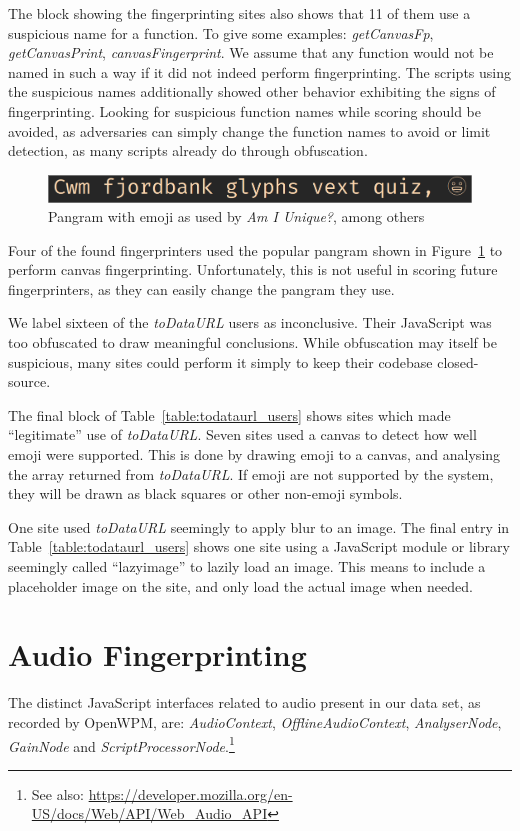 \documentclass[
    fontsize=12pt,
    headings=small,
    parskip=half,
    bibliography=totoc,
    numbers=noenddot,
    open=any
    ]{scrreprt}
\begin{document}
The block showing the fingerprinting sites also shows that 11 of them
use a suspicious name for a function. To give some examples:
\textit{getCanvasFp}, \textit{getCanvasPrint}, \textit{canvasFingerprint}.
We assume that any function would not be named in such a way if it did not
indeed perform fingerprinting.
The scripts using the suspicious names additionally showed other behavior
exhibiting the signs of fingerprinting.
Looking for suspicious function names while scoring should be avoided,
as adversaries can simply change the function names to avoid or
limit detection, as many scripts already do through obfuscation.

\begin{figure}
\centering
\includegraphics[scale=0.3]{images/fjordbank.png}
\caption{Pangram with emoji as used by \textit{Am I Unique?}, among others}
\label{code:pangram}
\end{figure}

Four of the found fingerprinters used the popular pangram shown in
Figure~\ref{code:pangram} to perform canvas fingerprinting.
Unfortunately, this is not useful in scoring future fingerprinters,
as they can easily change the pangram they use.

We label sixteen of the \textit{toDataURL} users as inconclusive.
Their JavaScript was too obfuscated to draw meaningful conclusions.
While obfuscation may itself be suspicious, many sites could perform
it simply to keep their codebase closed-source.

The final block of Table~\ref{table:todataurl_users} shows sites which
made ``legitimate'' use of \textit{toDataURL}. Seven sites used a canvas
to detect how well emoji were supported. This is done by drawing emoji
to a canvas, and analysing the array returned from \textit{toDataURL}.
If emoji are not supported by the system, they will be drawn as black
squares or other non-emoji symbols.

One site used \textit{toDataURL} seemingly to apply blur to an image.
The final entry in Table~\ref{table:todataurl_users} shows one site
using a JavaScript module or library seemingly called ``lazyimage''
to lazily load an image. This means to include a placeholder
image on the site, and only load the actual image when needed.


\section{Audio Fingerprinting}
The distinct JavaScript interfaces related to audio present in our data set,
as recorded by OpenWPM, are:
\textit{AudioContext},
\textit{OfflineAudioContext},
\textit{AnalyserNode},
\textit{GainNode} and \textit{ScriptProcessorNode}.\footnote{See also: \url{https://developer.mozilla.org/en-US/docs/Web/API/Web_Audio_API}}
\end{document}

